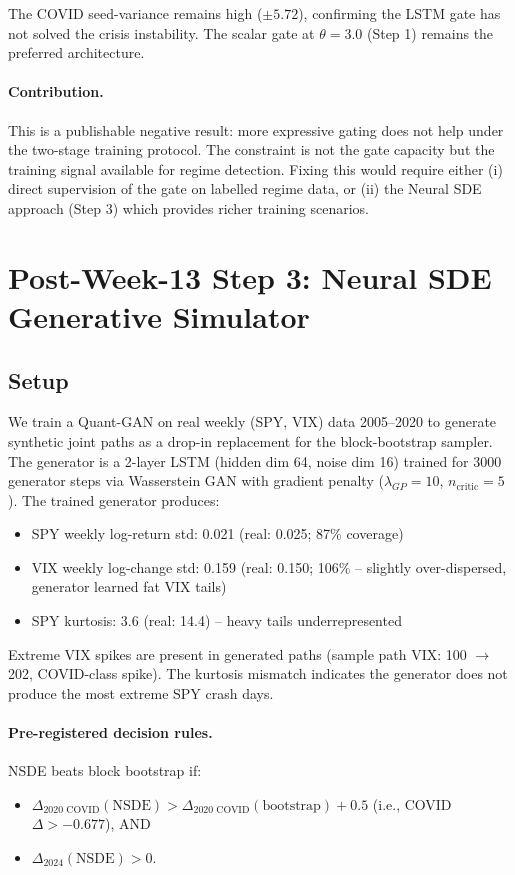 The COVID seed-variance remains high ($\pm 5.72$), confirming the
LSTM gate has not solved the crisis instability. The scalar gate at
$\theta = 3.0$ (Step 1) remains the preferred architecture.

\paragraph{Contribution.}
This is a publishable negative result: more expressive gating does not
help under the two-stage training protocol. The constraint is not the
gate capacity but the training signal available for regime detection.
Fixing this would require either (i) direct supervision of the gate
on labelled regime data, or (ii) the Neural SDE approach (Step 3)
which provides richer training scenarios.

\section{Post-Week-13 Step 3: Neural SDE Generative Simulator}
\label{sec:step3}

\subsection{Setup}

We train a Quant-GAN \citep{wiese2020} on real weekly (SPY, VIX) data
2005--2020 to generate synthetic joint paths as a drop-in replacement
for the block-bootstrap sampler. The generator is a 2-layer LSTM
(hidden dim 64, noise dim 16) trained for 3000 generator steps via
Wasserstein GAN with gradient penalty ($\lambda_{GP} = 10$,
$n_\text{critic} = 5$). The trained generator produces:
\begin{itemize}
  \item SPY weekly log-return std: 0.021 (real: 0.025; 87\% coverage)
  \item VIX weekly log-change std: 0.159 (real: 0.150; 106\% -- slightly
        over-dispersed, generator learned fat VIX tails)
  \item SPY kurtosis: 3.6 (real: 14.4) -- heavy tails underrepresented
\end{itemize}
Extreme VIX spikes are present in generated paths (sample path VIX:
100 $\to$ 202, COVID-class spike). The kurtosis mismatch indicates the
generator does not produce the most extreme SPY crash days.

\paragraph{Pre-registered decision rules.}
NSDE beats block bootstrap if:
\begin{itemize}
  \item $\Delta_{2020\text{ COVID}}(\text{NSDE}) > \Delta_{2020\text{ COVID}}(\text{bootstrap}) + 0.5$
        (i.e., COVID $\Delta > -0.677$), AND
  \item $\Delta_{2024}(\text{NSDE}) > 0$.
\end{itemize}

